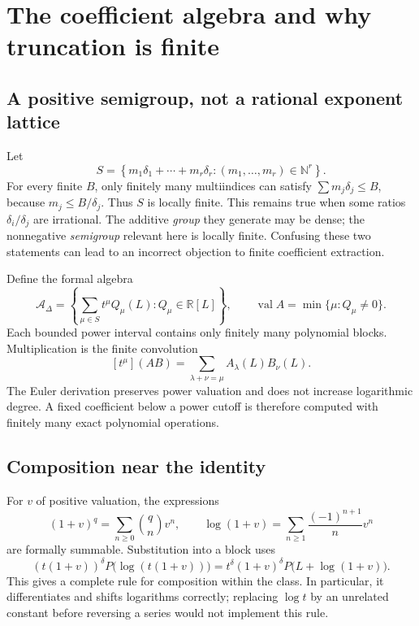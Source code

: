 \documentclass[11pt,a4paper]{article}
\numberwithin{equation}{section}
\theoremstyle{definition}\newtheorem{definition}[theorem]{Definition}
\theoremstyle{remark}\newtheorem{remark}[theorem]{Remark}
\newcommand{\R}{\mathbb R}\newcommand{\N}{\mathbb N}
\newcommand{\val}{\operatorname{val}}
\newcommand{\PL}{\mathcal A_{\Delta}}
\begin{document}
\section{The coefficient algebra and why truncation is finite}
\label{sec:algebra}

\subsection{A positive semigroup, not a rational exponent lattice}
Let
\begin{equation}\label{eq:semigroup}
 S=\left\{m_1\delta_1+\cdots+m_r\delta_r:
           (m_1,\ldots,m_r)\in\N^r\right\}.
\end{equation}
For every finite \(B\), only finitely many multiindices can satisfy
\(\sum m_j\delta_j\le B\), because \(m_j\le B/\delta_j\).
Thus \(S\) is locally finite. This remains true when some ratios
\(\delta_i/\delta_j\) are irrational. The additive \emph{group} they generate
may be dense; the nonnegative \emph{semigroup} relevant here is locally finite.
Confusing these two statements can lead to an incorrect objection to
finite coefficient extraction.

Define the formal algebra
\[
 \PL=\left\{\sum_{\mu\in S}t^\mu Q_\mu(L):Q_\mu\in\R[L]\right\},
 \qquad
 \val A=\min\{\mu:Q_\mu\ne0\}.
\]
Each bounded power interval contains only finitely many polynomial blocks.
Multiplication is the finite convolution
\[
 [t^\mu](AB)=\sum_{\lambda+\nu=\mu}A_\lambda(L)B_\nu(L).
\]
The Euler derivation preserves power valuation and does not increase
logarithmic degree. A fixed coefficient below a power cutoff is therefore
computed with finitely many exact polynomial operations.

\subsection{Composition near the identity}
For \(v\) of positive valuation, the expressions
\begin{equation}\label{eq:unit-functions}
 (1+v)^q=\sum_{n\ge0}\binom qn v^n,
 \qquad
 \log(1+v)=\sum_{n\ge1}\frac{(-1)^{n+1}}n v^n
\end{equation}
are formally summable. Substitution into a block uses
\begin{equation}\label{eq:block-substitution}
 (t(1+v))^\delta P\bigl(\log(t(1+v))\bigr)
 =t^\delta(1+v)^\delta P\bigl(L+\log(1+v)\bigr).
\end{equation}
This gives a complete rule for composition within the class. In particular,
it differentiates and shifts logarithms correctly; replacing \(\log t\) by
an unrelated constant before reversing a series would not implement this rule.
\end{document}
